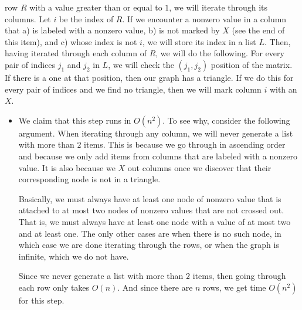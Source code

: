\documentclass{article}
\begin{document}
\begin{description}
\begin{enumerate}
                row $R$ with a value greater than or equal to $1$, we will iterate
                through its columns. Let $i$ be the index of $R$. If we encounter a
                nonzero value in a column
                that a) is labeled with a nonzero value, b) is not marked by $X$
                (see the end of this item), and c) whose
                index is not $i$, we will store its index in a list $L$. Then, having
                iterated through each column of $R$, we will do the following.
                For every pair of indices
                $j_1$ and $j_2$ in $L$, we will check the $(j_1,j_2)$ position of
                the matrix. If there is a one at that position, then our graph
                has a triangle. If we do this for every pair of indices and we
                find no triangle, then we will mark column $i$ with an $X$.
                \begin{itemize}
                    \item We claim that this step runs in $O(n^2)$. To see why,
                        consider the following argument. When iterating through
                        any column, we will never generate a list with more than
                        $2$ items. This is because we go through in ascending
                        order and because we only add items from columns that
                        are labeled with a nonzero value. It is also because we
                        $X$ out columns once we discover that their
                        corresponding node is not in a triangle.

                        Basically, we must always have
                        at least one node of nonzero value that is
                        attached to at most two nodes of nonzero values that are
                        not crossed out. That is, we must always have at least
                        one node with a value of at most two and at least
                        one. The
                        only other cases are when there is no such node,
                        in which case we are done iterating through the rows, or when the graph is
                        infinite, which we do not have.

                        Since we never generate a list with more than $2$ items,
                        then going through each row only takes $O(n)$. And since
                        there are $n$ rows, we get time
                        $O(n^2)$ for this step.
                \end{itemize}
        \end{enumerate}


\end{description}
\end{document}
